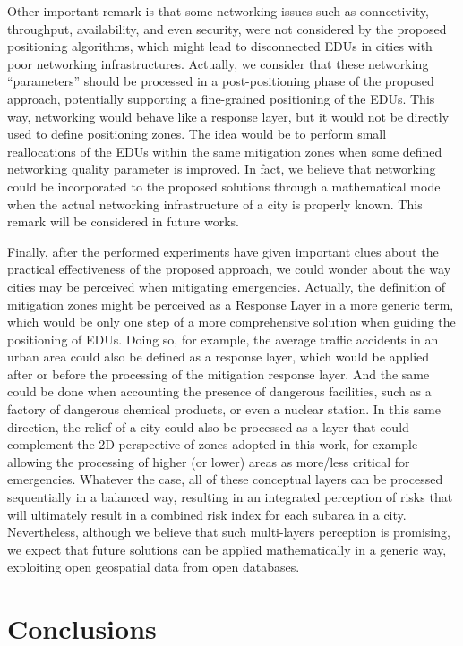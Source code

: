 \begin{refsection}
Other important remark is that some networking issues such as connectivity, throughput, availability, and even security, were not considered by the proposed positioning algorithms, which might lead to disconnected EDUs in cities with poor networking infrastructures. Actually, we consider that these networking ``parameters'' should be processed in a post-positioning phase of the proposed approach, potentially supporting a fine-grained positioning of the EDUs. This way, networking would behave like a response layer, but it would not be directly used to define positioning zones. The idea would be to perform small reallocations of the EDUs within the same mitigation zones when some defined networking quality parameter is improved. In fact, we believe that networking could be incorporated to the proposed solutions through a mathematical model when the actual networking infrastructure of a city is properly known. This remark will be considered in future works.

Finally, after the performed experiments have given important clues about the practical effectiveness of the proposed approach, we could wonder about the way cities may be perceived when mitigating emergencies. Actually, the definition of mitigation zones might be perceived as a Response Layer in a more generic term, which would be only one step of a more comprehensive solution when guiding the positioning of EDUs. Doing so, for example, the average traffic accidents in an urban area could also be defined as a response layer, which would be applied after or before the processing of the mitigation response layer. And the same could be done when accounting the presence of dangerous facilities, such as a factory of dangerous chemical products, or even a nuclear station. In this same direction, the relief of a city could also be processed as a layer that could complement the 2D perspective of zones adopted in this work, for example allowing the processing of higher (or lower) areas as more/less critical for emergencies. Whatever the case, all of these conceptual layers can be processed sequentially in a balanced way, resulting in an integrated perception of risks that will ultimately result in a combined risk index for each subarea in a city. Nevertheless, although we believe that such multi-layers perception is promising, we expect that future solutions can be applied mathematically in a generic way, exploiting open geospatial data from open databases.


\section{Conclusions}


\end{refsection}
